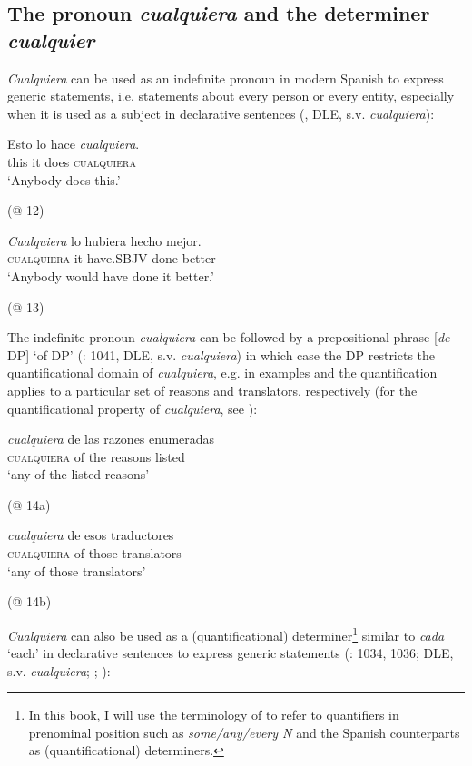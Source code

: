 \subsection{{The} {pronoun} {\textit{cualquiera}} {and} {the} {determiner} {\textit{cualquier}}} \label{sec:2.1.1}

\textit{Cualquiera} can be used as an indefinite pronoun in modern Spanish to express generic statements, i.e. statements about every person or every entity, especially when it is used as a subject in declarative sentences (\citealt{Brucart1999, Sanchezlopez1999, Eberenz2000}, DLE, s.v. \textit{cualquiera}):

\ea
\label{ex:key:20} %
  \gll Esto lo hace \textit{cualquiera}.\\
this it does \textsc{cualquiera}\\
  \glt ‘Anybody does this.’

  (@ 12)
\z

\ea
\label{ex:key:21} %
  \gll \textit{Cualquiera} lo hubiera hecho mejor.\\
\textsc{cualquiera} it have.\textsc{SBJV} done better\\
  \glt ‘Anybody would have done it better.’

  (@ 13)
\z

The indefinite pronoun \textit{cualquiera} can be followed by a prepositional phrase [\textit{de} DP] ‘of DP’ (\citealt{Sanchezlopez1999}: 1041, DLE, s.v. \textit{cualquiera}) in which case the DP restricts the quantificational domain of \textit{cualquiera}, e.g. in examples  and   the quantification applies to a particular set of reasons and translators, respectively (for the quantificational property of \textit{cualquiera}, see ):

\ea %
\label{bkm:Ref72400832}  \gll \textit{cualquiera} de las razones enumeradas\\
\textsc{cualquiera} of the reasons listed\\
  \glt ‘any of the listed reasons’

  (@ 14a)
\z

\ea %
\label{bkm:Ref533953098} \gll \textit{cualquiera} de esos traductores\\
\textsc{cualquiera} of those translators\\
  \glt ‘any of those translators’

  (@ 14b)
\z

\textit{Cualquiera} can also be used as a (quantificational) determiner\footnote{{In this book, I will use the terminology of \citet{Zamparelli2000} to refer to quantifiers in prenominal position such as} {\textit{some/any/every N}} {and the Spanish counterparts as (quantificational) determiners.}} similar to \textit{cada} ‘each’ in declarative sentences to express generic statements (\citealt{Sanchezlopez1999}: 1034, 1036; DLE, s.v. \textit{cualquiera}; \citealt{Menéndez-Benito2010}; \citealt{Rivero2011}):

